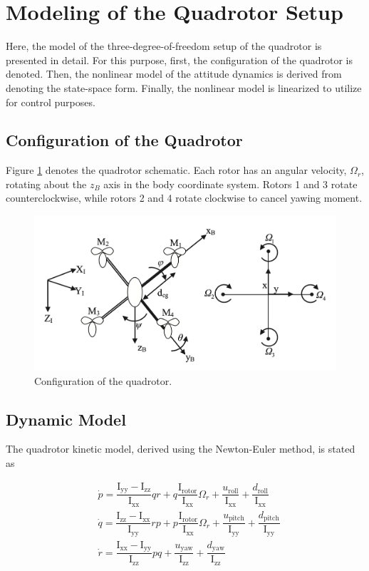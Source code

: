 \documentclass[3p,times]{elsarticle}
\begin{document}
\section{Modeling of the Quadrotor Setup}\label{sec:modeling}
Here, the model of the three-degree-of-freedom setup of the quadrotor is presented in detail. For this purpose, first, the configuration of the quadrotor is denoted. Then, the nonlinear model of the attitude dynamics is derived from denoting the state-space form. Finally, the nonlinear model is linearized to utilize for control purposes.
\subsection{Configuration of the Quadrotor}
Figure \ref{fig:schematic} denotes the quadrotor schematic. Each rotor has an angular velocity, $\Omega_r$, rotating about the $z_B$ axis in the body coordinate system. Rotors 1 and 3 rotate counterclockwise, while rotors 2 and 4 rotate clockwise to cancel yawing moment.

\begin{figure}[H]
    \centering
    \includegraphics[width=12cm]{../Figure/schematic.png}
    \caption{Configuration of the quadrotor.}
    \label{fig:schematic}
\end{figure}

\subsection{Dynamic Model}
The quadrotor kinetic model, derived using the Newton-Euler method, is stated as \cite{4399042, article_Bouabdallah}



\begin{align}
    &\dot p = \dfrac{\mathrm{I}_{\text{yy}} - \mathrm{I}_{\text{zz}}}{\mathrm{I}_{\text{xx}}} qr + q \dfrac{\mathrm{I}_{\text{rotor}}}{\mathrm{I}_{\text{xx}}}\Omega_r + \dfrac{u_{\text{roll}}}{\mathrm{I}_{\text{xx}}} + \dfrac{d_{\text{roll}}}{\mathrm{I}_{\text{xx}}}
    \\
&\dot q = \dfrac{\mathrm{I}_{\text{zz}} - \mathrm{I}_{\text{xx}}}{\mathrm{I}_{\text{yy}}} rp + p \dfrac{\mathrm{I}_{\text{rotor}}}{\mathrm{I}_{\text{xx}}}\Omega_r + \dfrac{u_{\text{pitch}}}{\mathrm{I}_{\text{yy}}} + \dfrac{d_{\text{pitch}}}{\mathrm{I}_{\text{yy}}}
\\
&\dot r = \dfrac{\mathrm{I}_{\text{xx}} - \mathrm{I}_{\text{yy}}}{\mathrm{I}_{\text{zz}}} pq  +  \dfrac{u_{\text{yaw}}}{\mathrm{I}_{\text{zz}}} + \dfrac{d_{\text{yaw}}}{\mathrm{I}_{\text{zz}}}
\end{align}
\end{document}
